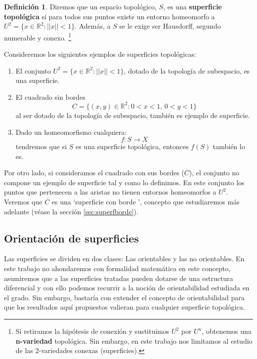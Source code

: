 \documentclass[a4paper,11pt,spanish, twoside, leqno]{tfg-uam}
\theoremstyle{definition}
\newtheorem{defin}[teor]{Definici\'on}
\begin{document}
\begin{defin}
\label{defin:superficie}
Diremos que un espacio topológico, $S$, es una \textbf{superficie topológica} si para todos sus puntos existe un entorno homeomorfo a $U^2 = \{x\in \mathbb{R}^2: ||x||<1 \}$. Además, a $S$ se le exige ser Hausdorff, segundo numerable y conexo. \footnote{Si retiramos la hipótesis de conexión y sustituimos $U^2$ por $U^n$, obtenemos una \textbf{n-variedad} topológica. Sin embargo, en este trabajo nos limitamos al estudio de las 2-variedades conexas (superficies).}
\end{defin}
Consideremos los siguientes ejemplos de superficies topológicas:
\begin{enumerate}
\item El conjunto $ U^2 = \{ x\in\mathbb{R}^2: ||x||<1 \} $, dotado de la topología de subespacio, es una superficie. 

\item El cuadrado sin bordes
\[ C = \{(x,y)\in \mathbb{R}^2: 0 <  x < 1,\, 0 < y < 1 \} \]
al ser dotado de la topología de subespacio, también es ejemplo de superficie.

\item Dado un homeomorfismo cualquiera:
\[ f:S \rightarrow X \]
tendremos que si $S$ es una superficie topológica, entonces $f(S)$ también lo es.
\end{enumerate}

Por otro lado, si consideramos el cuadrado con sus bordes ($\overline{C}$), el conjunto no compone un ejemplo de superficie tal y como lo definimos. En este conjunto los puntos que pertenecen a las aristas no tienen entornos homeomorfos a $U^2$. Veremos que $\overline{C}$ es una \textquoteleft superficie con borde \textquoteright, concepto que estudiaremos más adelante (véase la sección \ref{sec:superfborde}).
\subsection{Orientación de superficies}
\label{sec:orientabilidad}
Las superficies se dividen en dos clases: Las orientables y las no orientables. En este trabajo no ahondaremos con formalidad matemática en este concepto, asumiremos que a las superficies tratadas pueden dotarse de una estructura diferencial y con ello podemos recurrir a la noción de orientabilidad estudiada en el grado. Sin embargo, bastaría con extender el concepto de orientabilidad para que los resultados aquí propuestos valieran para cualquier superficie topológica.
\end{document}
